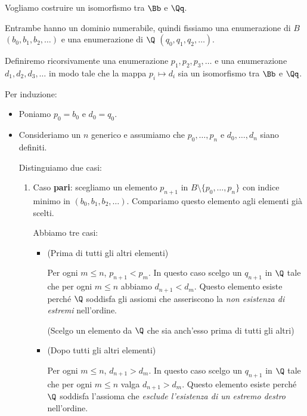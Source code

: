 \documentclass[a4paper,11pt]{report}
\begin{document}
\begin{proofframe}
    Vogliamo costruire un isomorfismo tra \( \Bb \) e \( \Qq \). 
    
    Entrambe hanno un dominio numerabile, quindi fissiamo una enumerazione di \( B \) \( (b_0, b_1, b_2, \dots) \) e una enumerazione di \( \Q \) \( (q_0, q_1, q_2, \dots) \).

    Definiremo ricorsivamente una enumerazione \( p_1, p_2, p_3, \dots \) e una enumerazione \( d_1, d_2, d_3, \dots \) in modo tale che la mappa \( p_i \mapsto d_i \) sia un isomorfismo tra \( \Bb \) e \( \Qq \).

    Per induzione:
    \begin{itemize}
        \item Poniamo \( p_0 = b_0 \) e \( d_0 = q_0 \).
        \item Consideriamo un \( n \) generico e assumiamo che \( p_0, \dots, p_n \) e \( d_0, \dots, d_n \) siano definiti.

            Distinguiamo due casi:

            \begin{enumerate}
                \item Caso \textbf{pari}: scegliamo un elemento \(p_{n+1}\) in \(B \setminus \{p_0, \dots, p_n\}\) con indice minimo in \((b_0, b_1, b_2, \dots)\). Compariamo questo elemento agli elementi già scelti. 

                    Abbiamo tre casi:

                    \begin{itemize}
                        \item {\color{gray}(Prima di tutti gli altri elementi)}

                            Per ogni \(m \le n\), \(p_{n+1} < p_m\). In questo caso scelgo un \(q_{n+1}\) in \( \Q\) tale che per ogni \(m \le n\) abbiamo \(d_{n+1} < d_m\). Questo elemento esiste perché \( \Q \) soddisfa gli assiomi che asseriscono la \textit{non esistenza di estremi} nell'ordine. 

                            {\color{gray}(Scelgo un elemento da \( \Q \) che sia anch'esso prima di tutti gli altri)}

                        \item {\color{gray}(Dopo tutti gli altri elementi)}

                            Per ogni \(m \le n\), \(d_{n+1} > d_m\). In questo caso scelgo un \(q_{n+1}\) in \(\Q \) tale che per ogni \(m \le n\) valga \(d_{n+1} > d_m\). Questo elemento esiste perché \( \Q \) soddisfa l'assioma che \textit{esclude l'esistenza di un estremo destro} nell'ordine.
                            

\end{itemize}
\end{enumerate}
\end{itemize}
\end{proofframe}
\end{document}

